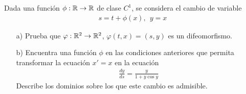 \documentclass[12pt]{book}
\begin{document}
    \begin{ejercicio}
        Dada una función $\phi:\mathbb{R} \to \mathbb{R}$ de clase $C^1$, se considera el cambio de variable
        \begin{gather*}
            s=t+\phi(x),\ \ y=x
        \end{gather*}
        \begin{enumerate}
            \item[a)] Prueba que $\varphi:\mathbb{R}^2 \to \mathbb{R}^2$, $\varphi(t,x)=(s,y)$ es un difeomorfismo.
            \item[b)] Encuentra una función $\phi$ en las condiciones anteriores que permita transformar la ecuación $x'=x$ en la ecuación
            \begin{gather*}
                \frac{dy}{ds}=\frac{y}{1+y\cos y}
            \end{gather*}
            Describe los dominios sobre los que este cambio es admisible.
        \end{enumerate}
    \end{ejercicio}
\end{document}
